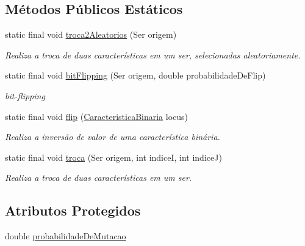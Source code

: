 \subsection*{Métodos Públicos Estáticos}
\begin{DoxyCompactItemize}
\item 
static final void \hyperlink{classic_1_1populacional_1_1algoritmo_1_1operadores_1_1_mutador_3_01_t_01extends_01_ser_01_4_afbcb2c72a47a82dd94dcfb4295953d88}{troca2\-Aleatorios} (Ser origem)
\begin{DoxyCompactList}\small\item\em Realiza a troca de duas características em um ser, selecionadas aleatoriamente. \end{DoxyCompactList}\item 
static final void \hyperlink{classic_1_1populacional_1_1algoritmo_1_1operadores_1_1_mutador_3_01_t_01extends_01_ser_01_4_aebd2c6138299aa0bb03788702683133b}{bit\-Flipping} (Ser origem, double probabilidade\-De\-Flip)
\begin{DoxyCompactList}\small\item\em bit-\/flipping \end{DoxyCompactList}\item 
static final void \hyperlink{classic_1_1populacional_1_1algoritmo_1_1operadores_1_1_mutador_3_01_t_01extends_01_ser_01_4_a173c08a7e8ae9b3395bb24a801ac593e}{flip} (\hyperlink{classic_1_1populacional_1_1seres_1_1binarios_1_1_caracteristica_binaria}{Caracteristica\-Binaria} locus)
\begin{DoxyCompactList}\small\item\em Realiza a inversão de valor de uma característica binária. \end{DoxyCompactList}\item 
static final void \hyperlink{classic_1_1populacional_1_1algoritmo_1_1operadores_1_1_mutador_3_01_t_01extends_01_ser_01_4_a7a97c38f07d20dcb3bd2c8b83bd64444}{troca} (Ser origem, int indice\-I, int indice\-J)
\begin{DoxyCompactList}\small\item\em Realiza a troca de duas características em um ser. \end{DoxyCompactList}\end{DoxyCompactItemize}
\subsection*{Atributos Protegidos}
\begin{DoxyCompactItemize}
\item 
double \hyperlink{classic_1_1populacional_1_1algoritmo_1_1operadores_1_1_mutador_3_01_t_01extends_01_ser_01_4_a1ef75bbeff32bd2bf0b56c8b2ad86c60}{probabilidade\-De\-Mutacao}
\end{DoxyCompactItemize}

